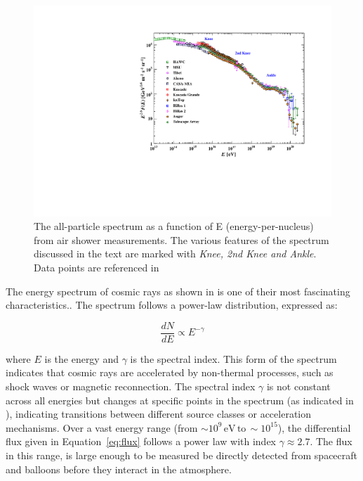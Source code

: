 \begin{figure}[h]
    \caption{The all-particle spectrum as a function of E (energy-per-nucleus) from air shower measurements. The various features of the spectrum discussed in the text are marked with \emph{Knee, 2nd Knee and Ankle}. Data points are referenced in \cite{PDG2022}}
    \includegraphics{./figures/nu_he/cr_fig8_AllParticle_21.pdf}
\end{figure}

The energy spectrum of cosmic rays as shown in  is one of their most fascinating characteristics.. The spectrum follows a power-law distribution, expressed as:

\begin{equation}\label{eq:flux}
\frac{dN}{dE} \propto E^{-\gamma}
\end{equation}


where \( E \) is the energy and \( \gamma \) is the spectral index. This form of the spectrum indicates that cosmic rays are accelerated by non-thermal processes, such as shock waves or magnetic reconnection. The spectral index \( \gamma \) is not constant across all energies but changes at specific points in the spectrum (as indicated in ), indicating transitions between different source classes or acceleration mechanisms. Over a vast energy range (from $\sim10^9 \, \mathrm{eV} \, \mathrm{to} \, \sim 10^{15} $), the differential flux given in Equation~\ref{eq:flux} follows a power law with index $\gamma\approx2.7$. The flux in this range, is large enough to be measured be directly detected from spacecraft and balloons before they interact in the atmosphere. 

